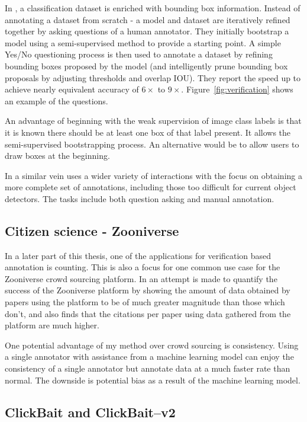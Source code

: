 In \cite{Papadopoulos2016}, a classification dataset is enriched with bounding box information. Instead of annotating a dataset from scratch - a model and dataset are iteratively refined together by asking questions of a human annotator. They initially bootstrap a model using a semi-supervised method  \cite{Cinbis2017} to provide a starting point. A simple Yes/No questioning process is then used to annotate a dataset by refining bounding boxes proposed by the model (and intelligently prune bounding box proposals by adjusting thresholds and overlap \gls{IOU}). They report the speed up to achieve nearly equivalent accuracy of $6\times$ to $9\times$.  Figure~\ref{fig:verification} shows an example of the questions.

An advantage of beginning with the weak supervision of image class labels is that it is known there should be at least one box of that label present. It allows the semi-supervised bootstrapping process. An alternative would be to allow users to draw boxes at the beginning. 

In a similar vein \cite{Russakovsky2015a} uses a wider variety of interactions with the focus on obtaining a more complete set of annotations, including those too difficult for current object detectors. The tasks include both question asking and manual annotation.


\subsection{Citizen science - Zooniverse \cite{Zooniverse}}

In a later part of this thesis, one of the applications for verification based annotation is counting. This is also a focus for one common use case for the Zooniverse crowd sourcing platform. In \cite{Watson2018} an attempt is made to quantify the success of the Zooniverse platform by showing the amount of data obtained by papers using the platform to be of much greater magnitude than those which don't, and also finds that the citations per paper using data gathered from the platform are much higher. 

One potential advantage of my method over crowd sourcing is consistency. Using a single annotator with assistance from a machine learning model can enjoy the consistency of a single annotator but annotate data at a much faster rate than normal. The downside is potential bias as a result of the machine learning model.

\subsection{ClickBait and ClickBait--v2 \cite{Teng2017, Teng2018}}

